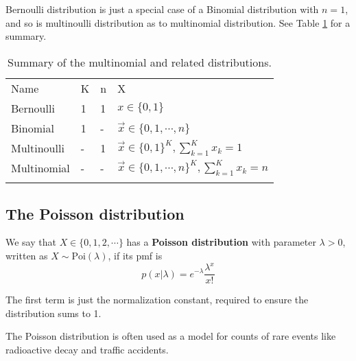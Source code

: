 Bernoulli distribution is just a special case of a Binomial distribution with $n=1$, and so is multinoulli distribution as to multinomial distribution. See Table \ref{tab:multinomial-summary} for a summary.

\begin{table}
\caption{Summary of the multinomial and related distributions.}
\label{tab:multinomial-summary}
\centering
\begin{tabular}{llll}
\hline\noalign{\smallskip}
Name & K & n & X \\
\noalign{\smallskip}\svhline\noalign{\smallskip}
Bernoulli & 1 & 1 & $x \in \{0,1\}$ \\
Binomial & 1 & - & $\vec{x} \in \{0,1,\cdots,n\}$ \\
Multinoulli & - & 1 & $\vec{x} \in \{0,1\}^K, \sum_{k=1}^K x_k=1$ \\
Multinomial & - & - & $\vec{x} \in \{0,1,\cdots,n\}^K, \sum_{k=1}^K x_k=n$ \\
\noalign{\smallskip}\hline
\end{tabular}
\end{table} 


\subsection{The Poisson distribution}
\begin{definition}
We say that $X \in \{0,1,2,\cdots\}$ has a \textbf{Poisson distribution} with parameter $\lambda>0$, written as $X \sim \text{Poi}(\lambda)$, if its pmf is
\begin{equation}
p(x|\lambda)=e^{-\lambda}\dfrac{\lambda^x}{x!}
\end{equation}
\end{definition}

The first term is just the normalization constant, required to ensure the distribution sums to 1.

The Poisson distribution is often used as a model for counts of rare events like radioactive decay and traffic accidents. 

